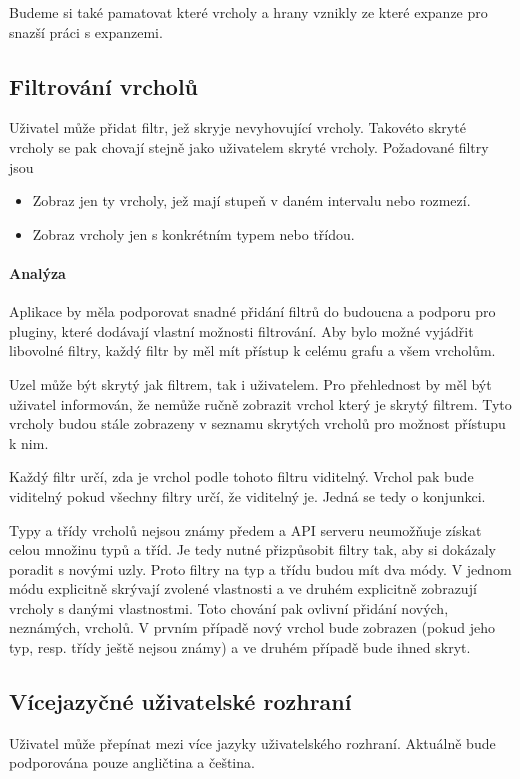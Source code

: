 Budeme si také pamatovat které vrcholy a hrany vznikly ze které expanze pro snazší práci s expanzemi.

\subsection*{Filtrování vrcholů}
Uživatel může přidat filtr, jež skryje nevyhovující vrcholy. Takovéto skryté vrcholy se pak chovají stejně jako uživatelem skryté vrcholy. Požadované filtry jsou
\begin{itemize}
    \item Zobraz jen ty vrcholy, jež mají stupeň v daném intervalu nebo rozmezí.
    \item Zobraz vrcholy jen s konkrétním typem nebo třídou.
\end{itemize}

\paragraph{Analýza} Aplikace by měla podporovat snadné přidání filtrů do budoucna a podporu pro pluginy, které dodávají vlastní možnosti filtrování. Aby bylo možné vyjádřit libovolné filtry, každý filtr by měl mít přístup k celému grafu a všem vrcholům.

Uzel může být skrytý jak filtrem, tak i uživatelem. Pro přehlednost by měl být uživatel informován, že nemůže ručně zobrazit vrchol který je skrytý filtrem. Tyto vrcholy budou stále zobrazeny v seznamu skrytých vrcholů pro možnost přístupu k nim.

Každý filtr určí, zda je vrchol podle tohoto filtru viditelný. Vrchol pak bude viditelný pokud všechny filtry určí, že viditelný je. Jedná se tedy o konjunkci.

Typy a třídy vrcholů nejsou známy předem a API serveru neumožňuje získat celou množinu typů a tříd. Je tedy nutné přizpůsobit filtry tak, aby si dokázaly poradit s novými uzly. Proto filtry na typ a třídu budou mít dva módy. V jednom módu explicitně skrývají zvolené vlastnosti a ve druhém explicitně zobrazují vrcholy s danými vlastnostmi. Toto chování pak ovlivní přidání nových, neznámých, vrcholů. V prvním případě nový vrchol bude zobrazen (pokud jeho typ, resp. třídy ještě nejsou známy) a ve druhém případě bude ihned skryt.

\subsection*{Vícejazyčné uživatelské rozhraní}
Uživatel může přepínat mezi více jazyky uživatelského rozhraní. Aktuálně bude podporována pouze angličtina a čeština.

